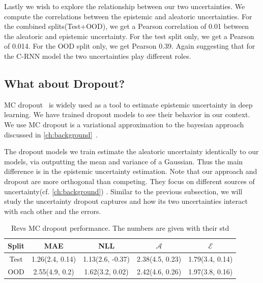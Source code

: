 Lastly we wish to explore the relationship between our two uncertainties. We compute the correlations between the epistemic and aleatoric uncertainties. For the combined splits(Test+OOD), we get a Pearson correlation of 0.01 between the aleatoric and epistemic uncertainty. For the test split only, we get a Pearson of 0.014. For the OOD split only, we get Pearson 0.39. Again suggesting that for the C-RNN model the two uncertainties play different roles. 

\clearpage
\subsection{What about Dropout?}

MC dropout~\citep{gal2016dropout} is widely used as a tool to estimate epistemic uncertainty in deep learning. We have trained dropout models to see their behavior in our context. We use MC dropout is a variational approximation to the bayesian approach discussed in \cref{ch:background}~\citep{gal2016dropout}. 

The dropout models we train estimate the aleatoric uncertainty identically to our models, via outputting the mean and variance of a Gaussian. Thus the main difference is in the epistemic uncertainty estimation. Note that our approach and dropout are more orthogonal than competing. They focus on different sources of uncertainty(cf. \ref{ch:background}) . Similar to the previous subsection, we will study the uncertainty dropout captures and how its two uncertainties interact with each other and the errors.

\begin{table}[htbp]
\centering
    \begin{tabular}{c  c  c   c  c }  
        \toprule
        Split & MAE & NLL & $\mathcal{A}$ & $\mathcal{E}$\\
        \midrule
        Test &  1.26(2.4, 0.14) & 1.13(2.6, -0.37) & 2.38(4.5, 0.23) &  1.79(3.4, 0.14) \\
        OOD  &  2.55(4.9, 0.2)&  1.62(3.2, 0.02)& 2.42(4.6, 0.26)&  1.97(3.8, 0.16) \\
        \midrule
    \end{tabular}
    \caption[Revs MC dropout performance.]{Revs MC dropout performance. The numbers are given with their std}
    \label{tbl:revs_dropout}
\end{table}


  
